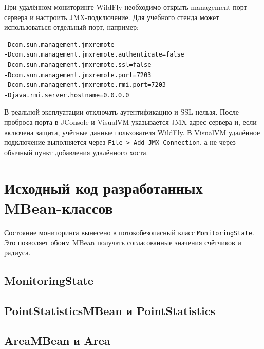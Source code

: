 \documentclass[a4paper,14pt]{extarticle}
\begin{document}
При удалённом мониторинге WildFly необходимо открыть management-порт сервера и настроить JMX-подключение. Для учебного стенда может использоваться отдельный порт, например:

\begin{lstlisting}[style=textstyle,caption={Пример параметров запуска удалённого JMX}]
-Dcom.sun.management.jmxremote
-Dcom.sun.management.jmxremote.authenticate=false
-Dcom.sun.management.jmxremote.ssl=false
-Dcom.sun.management.jmxremote.port=7203
-Dcom.sun.management.jmxremote.rmi.port=7203
-Djava.rmi.server.hostname=0.0.0.0
\end{lstlisting}

В реальной эксплуатации отключать аутентификацию и SSL нельзя. После проброса порта в JConsole и VisualVM указывается JMX-адрес сервера и, если включена защита, учётные данные пользователя WildFly. В VisualVM удалённое подключение выполняется через \texttt{File > Add JMX Connection}, а не через обычный пункт добавления удалённого хоста.

\section{Исходный код разработанных MBean-классов}

Состояние мониторинга вынесено в потокобезопасный класс \texttt{MonitoringState}. Это позволяет обоим MBean получать согласованные значения счётчиков и радиуса.

\subsection{MonitoringState}


\subsection{PointStatisticsMBean и PointStatistics}



\subsection{AreaMBean и Area}


\end{document}
